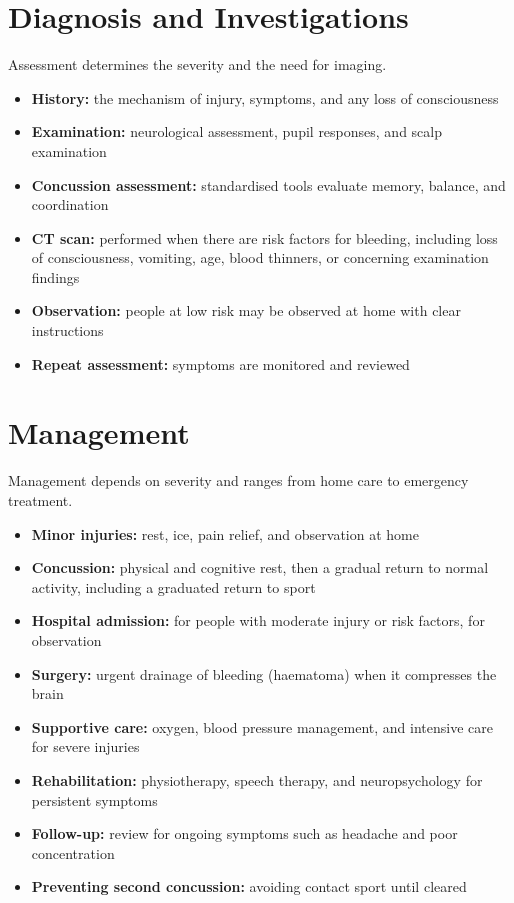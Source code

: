 \section*{Diagnosis and Investigations}
Assessment determines the severity and the need for imaging.

\begin{itemize}
    \item \textbf{History:} the mechanism of injury, symptoms, and any loss of consciousness
    \item \textbf{Examination:} neurological assessment, pupil responses, and scalp examination
    \item \textbf{Concussion assessment:} standardised tools evaluate memory, balance, and coordination
    \item \textbf{CT scan:} performed when there are risk factors for bleeding, including loss of consciousness, vomiting, age, blood thinners, or concerning examination findings
    \item \textbf{Observation:} people at low risk may be observed at home with clear instructions
    \item \textbf{Repeat assessment:} symptoms are monitored and reviewed
\end{itemize}

\section*{Management}
Management depends on severity and ranges from home care to emergency treatment.

\begin{itemize}
    \item \textbf{Minor injuries:} rest, ice, pain relief, and observation at home
    \item \textbf{Concussion:} physical and cognitive rest, then a gradual return to normal activity, including a graduated return to sport
    \item \textbf{Hospital admission:} for people with moderate injury or risk factors, for observation
    \item \textbf{Surgery:} urgent drainage of bleeding (haematoma) when it compresses the brain
    \item \textbf{Supportive care:} oxygen, blood pressure management, and intensive care for severe injuries
    \item \textbf{Rehabilitation:} physiotherapy, speech therapy, and neuropsychology for persistent symptoms
    \item \textbf{Follow-up:} review for ongoing symptoms such as headache and poor concentration
    \item \textbf{Preventing second concussion:} avoiding contact sport until cleared
\end{itemize}

